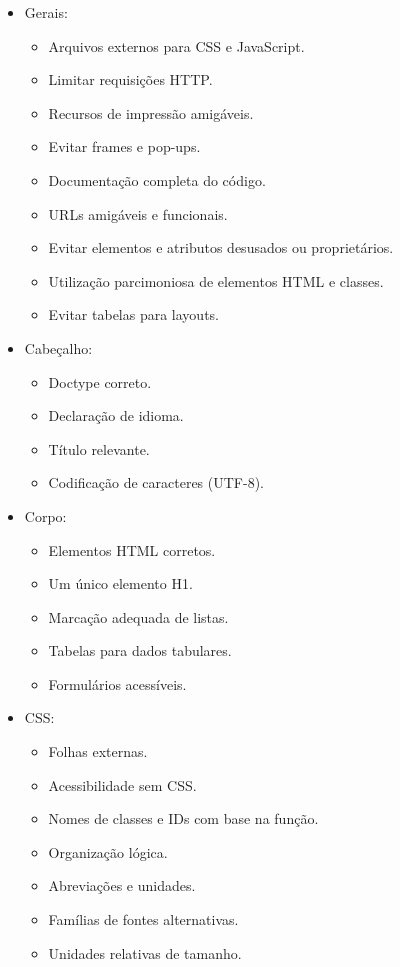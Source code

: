 \documentclass[
  12pt,
  openright,
  twoside,
  a4paper,
  english,
  french,
  spanish,
  brazil
]{abntex2}
\begin{document}
\begin{itemize}
  \item Gerais:
  \begin{itemize}
    \item Arquivos externos para CSS e JavaScript.
    \item Limitar requisições HTTP.
    \item Recursos de impressão amigáveis.
    \item Evitar frames e pop-ups.
    \item Documentação completa do código.
    \item URLs amigáveis e funcionais.
    \item Evitar elementos e atributos desusados ou proprietários.
    \item Utilização parcimoniosa de elementos HTML e classes.
    \item Evitar tabelas para layouts.
  \end{itemize}
  \item Cabeçalho:
  \begin{itemize}
    \item Doctype correto.
    \item Declaração de idioma.
    \item Título relevante.
    \item Codificação de caracteres (UTF-8).
  \end{itemize}
  \item Corpo:
  \begin{itemize}
    \item Elementos HTML corretos.
    \item Um único elemento H1.
    \item Marcação adequada de listas.
    \item Tabelas para dados tabulares.
    \item Formulários acessíveis.
  \end{itemize}
  \item CSS:
  \begin{itemize}
    \item Folhas externas.
    \item Acessibilidade sem CSS.
    \item Nomes de classes e IDs com base na função.
    \item Organização lógica.
    \item Abreviações e unidades.
    \item Famílias de fontes alternativas.
    \item Unidades relativas de tamanho.

\end{itemize}
\end{itemize}
\end{document}
